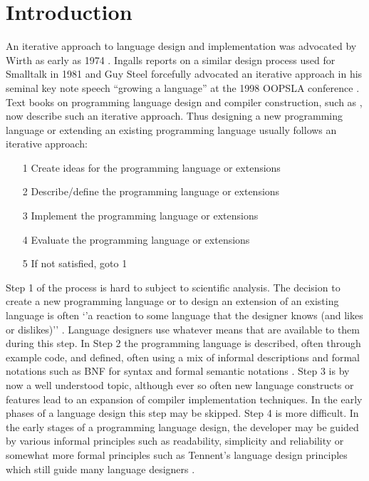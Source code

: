 \documentclass[10pt]{sigplanconf}
\begin{document}
\section{Introduction}
An iterative approach to language design and implementation was advocated by Wirth as early as 1974 \cite{wirth1974design}.
Ingalls reports on a similar design process used for Smalltalk in 1981 \cite{ingalls1981design} and
Guy Steel forcefully advocated an iterative approach in his seminal key note speech ``growing a language'' at the 1998 OOPSLA conference \cite{steele1999growing}.
Text books on programming language design and compiler construction, such as \cite{watt2000programming}, now describe such an iterative approach.
Thus designing a new programming language or extending an existing programming language usually follows an iterative approach:
\begin{itemize}
\item[1] Create ideas for the programming language or extensions
\item[2] Describe/define the programming language or extensions
\item[3] Implement  the programming language or extensions
\item[4] Evaluate  the programming language or extensions
\item[5] If not satisfied, goto 1
\end{itemize}



Step 1 of the process is hard to subject to scientific analysis. The decision to create a new programming language or to design an extension of an existing language is often `'a reaction to some language that the designer knows (and likes or dislikes)'' \cite{sestoft2012programming}. Language designers use whatever means that are available to them during this step. 
In Step 2 the programming language is described, often through example code, and defined, often using a mix of informal descriptions and formal notations such as BNF for syntax and formal semantic notations \cite{watt2000programming}.
Step 3 is by now a well understood topic, although ever so often new language constructs or features lead to an expansion of compiler implementation techniques. In the early phases of a language design this step may be skipped.
Step 4 is more difficult. In the early stages of a programming language design, the developer may be guided by various informal principles such as readability, simplicity and reliability \cite{pratt1984programming,sebesta2012concepts} or somewhat more formal principles such as Tennent's language design principles \cite{tennent1981principles} which still guide many language designers \cite{sestoft2012programming}.
\end{document}
